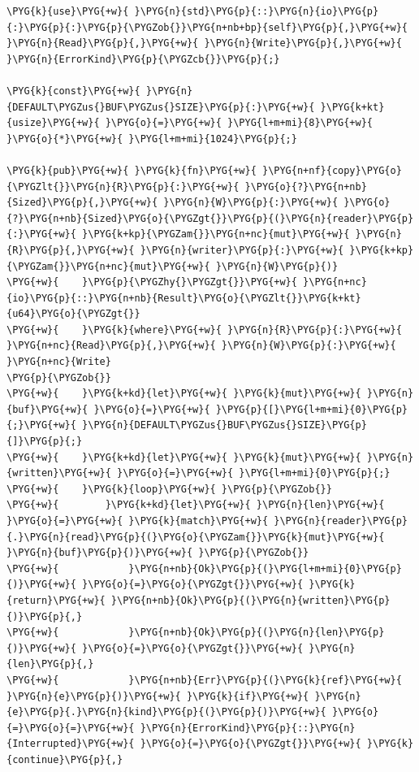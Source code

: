 \begin{Verbatim}[commandchars=\\\{\},breaklines=true,breakanywhere=true,fontsize=\codefont,xleftmargin=17bp]
\PYG{k}{use}\PYG{+w}{ }\PYG{n}{std}\PYG{p}{::}\PYG{n}{io}\PYG{p}{:}\PYG{p}{:}\PYG{p}{\PYGZob{}}\PYG{n+nb+bp}{self}\PYG{p}{,}\PYG{+w}{ }\PYG{n}{Read}\PYG{p}{,}\PYG{+w}{ }\PYG{n}{Write}\PYG{p}{,}\PYG{+w}{ }\PYG{n}{ErrorKind}\PYG{p}{\PYGZcb{}}\PYG{p}{;}

\PYG{k}{const}\PYG{+w}{ }\PYG{n}{DEFAULT\PYGZus{}BUF\PYGZus{}SIZE}\PYG{p}{:}\PYG{+w}{ }\PYG{k+kt}{usize}\PYG{+w}{ }\PYG{o}{=}\PYG{+w}{ }\PYG{l+m+mi}{8}\PYG{+w}{ }\PYG{o}{*}\PYG{+w}{ }\PYG{l+m+mi}{1024}\PYG{p}{;}

\PYG{k}{pub}\PYG{+w}{ }\PYG{k}{fn}\PYG{+w}{ }\PYG{n+nf}{copy}\PYG{o}{\PYGZlt{}}\PYG{n}{R}\PYG{p}{:}\PYG{+w}{ }\PYG{o}{?}\PYG{n+nb}{Sized}\PYG{p}{,}\PYG{+w}{ }\PYG{n}{W}\PYG{p}{:}\PYG{+w}{ }\PYG{o}{?}\PYG{n+nb}{Sized}\PYG{o}{\PYGZgt{}}\PYG{p}{(}\PYG{n}{reader}\PYG{p}{:}\PYG{+w}{ }\PYG{k+kp}{\PYGZam{}}\PYG{n+nc}{mut}\PYG{+w}{ }\PYG{n}{R}\PYG{p}{,}\PYG{+w}{ }\PYG{n}{writer}\PYG{p}{:}\PYG{+w}{ }\PYG{k+kp}{\PYGZam{}}\PYG{n+nc}{mut}\PYG{+w}{ }\PYG{n}{W}\PYG{p}{)}
\PYG{+w}{    }\PYG{p}{\PYGZhy{}\PYGZgt{}}\PYG{+w}{ }\PYG{n+nc}{io}\PYG{p}{::}\PYG{n+nb}{Result}\PYG{o}{\PYGZlt{}}\PYG{k+kt}{u64}\PYG{o}{\PYGZgt{}}
\PYG{+w}{    }\PYG{k}{where}\PYG{+w}{ }\PYG{n}{R}\PYG{p}{:}\PYG{+w}{ }\PYG{n+nc}{Read}\PYG{p}{,}\PYG{+w}{ }\PYG{n}{W}\PYG{p}{:}\PYG{+w}{ }\PYG{n+nc}{Write}
\PYG{p}{\PYGZob{}}
\PYG{+w}{    }\PYG{k+kd}{let}\PYG{+w}{ }\PYG{k}{mut}\PYG{+w}{ }\PYG{n}{buf}\PYG{+w}{ }\PYG{o}{=}\PYG{+w}{ }\PYG{p}{[}\PYG{l+m+mi}{0}\PYG{p}{;}\PYG{+w}{ }\PYG{n}{DEFAULT\PYGZus{}BUF\PYGZus{}SIZE}\PYG{p}{]}\PYG{p}{;}
\PYG{+w}{    }\PYG{k+kd}{let}\PYG{+w}{ }\PYG{k}{mut}\PYG{+w}{ }\PYG{n}{written}\PYG{+w}{ }\PYG{o}{=}\PYG{+w}{ }\PYG{l+m+mi}{0}\PYG{p}{;}
\PYG{+w}{    }\PYG{k}{loop}\PYG{+w}{ }\PYG{p}{\PYGZob{}}
\PYG{+w}{        }\PYG{k+kd}{let}\PYG{+w}{ }\PYG{n}{len}\PYG{+w}{ }\PYG{o}{=}\PYG{+w}{ }\PYG{k}{match}\PYG{+w}{ }\PYG{n}{reader}\PYG{p}{.}\PYG{n}{read}\PYG{p}{(}\PYG{o}{\PYGZam{}}\PYG{k}{mut}\PYG{+w}{ }\PYG{n}{buf}\PYG{p}{)}\PYG{+w}{ }\PYG{p}{\PYGZob{}}
\PYG{+w}{            }\PYG{n+nb}{Ok}\PYG{p}{(}\PYG{l+m+mi}{0}\PYG{p}{)}\PYG{+w}{ }\PYG{o}{=}\PYG{o}{\PYGZgt{}}\PYG{+w}{ }\PYG{k}{return}\PYG{+w}{ }\PYG{n+nb}{Ok}\PYG{p}{(}\PYG{n}{written}\PYG{p}{)}\PYG{p}{,}
\PYG{+w}{            }\PYG{n+nb}{Ok}\PYG{p}{(}\PYG{n}{len}\PYG{p}{)}\PYG{+w}{ }\PYG{o}{=}\PYG{o}{\PYGZgt{}}\PYG{+w}{ }\PYG{n}{len}\PYG{p}{,}
\PYG{+w}{            }\PYG{n+nb}{Err}\PYG{p}{(}\PYG{k}{ref}\PYG{+w}{ }\PYG{n}{e}\PYG{p}{)}\PYG{+w}{ }\PYG{k}{if}\PYG{+w}{ }\PYG{n}{e}\PYG{p}{.}\PYG{n}{kind}\PYG{p}{(}\PYG{p}{)}\PYG{+w}{ }\PYG{o}{=}\PYG{o}{=}\PYG{+w}{ }\PYG{n}{ErrorKind}\PYG{p}{::}\PYG{n}{Interrupted}\PYG{+w}{ }\PYG{o}{=}\PYG{o}{\PYGZgt{}}\PYG{+w}{ }\PYG{k}{continue}\PYG{p}{,}

\end{Verbatim}
